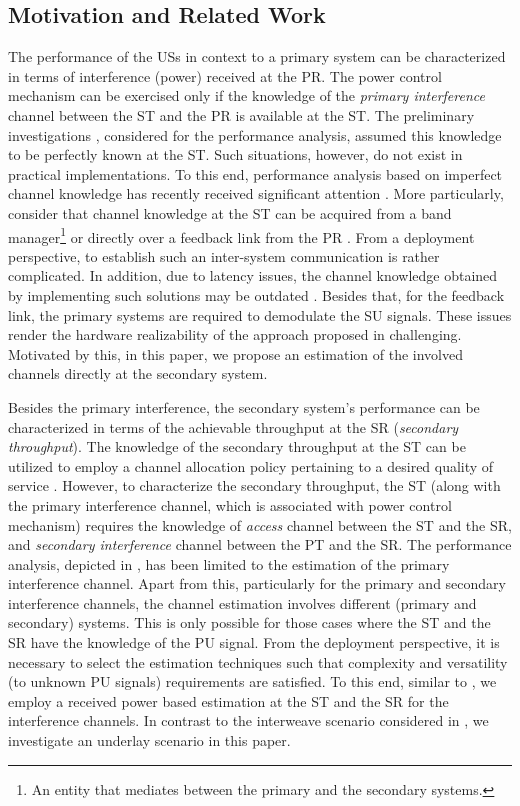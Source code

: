 \subsection{Motivation and Related Work}
The performance of the USs in context to a primary system can be characterized in terms of interference (power) received at the PR. The power control mechanism can be exercised only if the knowledge of the \textit{primary interference} channel between the ST and the PR is available at the ST. The preliminary investigations \cite{Xing07, Ghasemi07, Kang09}, considered for the performance analysis, assumed this knowledge to be perfectly known at the ST. Such situations, however, do not exist in practical implementations. To this end, performance analysis based on imperfect channel knowledge has recently received significant attention \cite{Musa09, Suraweera10, Kim12, Sharma15}. More particularly, \cite{Musa09, Suraweera10, Kim12} consider that channel knowledge at the ST can be acquired from a band manager\footnote{An entity that mediates between the primary and the secondary systems.} \cite{Peha05} or directly over a feedback link from the PR \cite{Zhang08}. From a deployment perspective, to establish such an inter-system communication is rather complicated. In addition, due to latency issues, the channel knowledge obtained by implementing such solutions may be outdated \cite{Suraweera10, Kim12}. Besides that, for the feedback link, the primary systems are required to demodulate the SU signals. These issues render the hardware realizability of the approach proposed in \cite{Musa09, Suraweera10, Kim12} challenging. Motivated by this, in this paper, we propose an estimation of the involved channels directly at the secondary system. 

Besides the primary interference, the secondary system's performance can be characterized in terms of the achievable throughput at the SR (\textit{secondary throughput}). The knowledge of the secondary throughput at the ST can be utilized to employ a channel allocation policy pertaining to a desired quality of service \cite{Lien10}. However, to characterize the secondary throughput, the ST (along with the primary interference channel, which is associated with power control mechanism) requires the knowledge of \textit{access} channel between the ST and the SR, and \textit{secondary interference} channel between the PT and the SR. The performance analysis, depicted in \cite{Kaushik15, Musa09, Suraweera10, Kim12}, has been limited to the estimation of the primary interference channel. Apart from this, particularly for the primary and secondary interference channels, the channel estimation involves different (primary and secondary) systems. This is only possible for those cases where the ST and the SR have the knowledge of the PU signal. From the deployment perspective, it is necessary to select the estimation techniques such that complexity and versatility (to unknown PU signals) requirements are satisfied. To this end, similar to \cite{Kaushik16}, we employ a received power based estimation at the ST and the SR for the interference channels. In contrast to the interweave scenario considered in \cite{Kaushik16}, we investigate an underlay scenario in this paper.   

